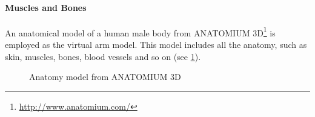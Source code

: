 \paragraph{Muscles and Bones}
An anatomical model of a human male body from ANATOMIUM 3D\footnote{\url{http://www.anatomium.com/}} is employed as the virtual arm model. This model includes all the anatomy, such as skin, muscles, bones, blood vessels and so on (see \figurename{\ref{fig:3-IMR:humanModel}}).
\begin{figure}[htb]
	\centering
	\caption{Anatomy model from ANATOMIUM 3D}
	\label{fig:3-IMR:humanModel}
\end{figure}

